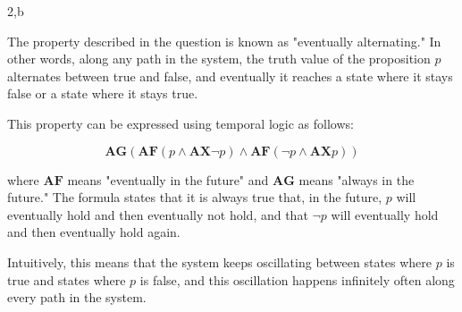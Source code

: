 \documentclass[11pt]{article}
\begin{document}
2,b 


The property described in the question is known as "eventually alternating." In other words, along any path in the system, the truth value of the proposition $p$ alternates between true and false, and eventually it reaches a state where it stays false or a state where it stays true.

This property can be expressed using temporal logic as follows:

$$\textbf{AG}(\textbf{AF}(p \land \textbf{AX}\neg p) \land \textbf{AF}(\neg p \land \textbf{AX}p))$$

where $\textbf{AF}$ means "eventually in the future" and $\textbf{AG}$ means "always in the future." The formula states that it is always true that, in the future, $p$ will eventually hold and then eventually not hold, and that $\neg p$ will eventually hold and then eventually hold again.

Intuitively, this means that the system keeps oscillating between states where $p$ is true and states where $p$ is false, and this oscillation happens infinitely often along every path in the system.
\end{document}
